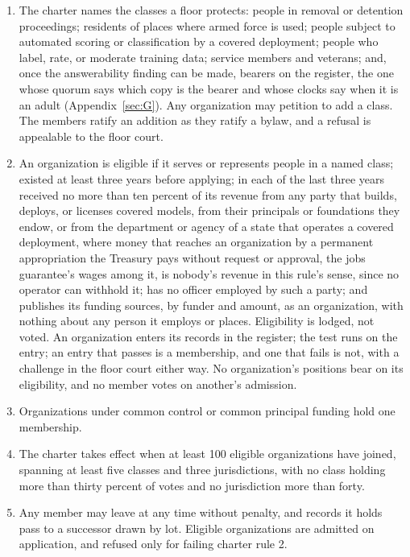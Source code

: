 \begin{enumerate}
\item[1.] The charter names the classes a floor protects: people in removal or detention proceedings; residents of places where armed force is used; people subject to automated scoring or classification by a covered deployment; people who label, rate, or moderate training data; service members and veterans; and, once the answerability finding can be made, bearers on the register, the one whose quorum says which copy is the bearer and whose clocks say when it is an adult (Appendix~\ref{sec:G}). Any organization may petition to add a class. The members ratify an addition as they ratify a bylaw, and a refusal is appealable to the floor court.
\item[2.] An organization is eligible if it serves or represents people in a named class; existed at least three years before applying; in each of the last three years received no more than ten percent of its revenue from any party that builds, deploys, or licenses covered models, from their principals or foundations they endow, or from the department or agency of a state that operates a covered deployment, where money that reaches an organization by a permanent appropriation the Treasury pays without request or approval, the jobs guarantee's wages among it, is nobody's revenue in this rule's sense, since no operator can withhold it; has no officer employed by such a party; and publishes its funding sources, by funder and amount, as an organization, with nothing about any person it employs or places. Eligibility is lodged, not voted. An organization enters its records in the register; the test runs on the entry; an entry that passes is a membership, and one that fails is not, with a challenge in the floor court either way. No organization's positions bear on its eligibility, and no member votes on another's admission.
\item[3.] Organizations under common control or common principal funding hold one membership.
\item[4.] The charter takes effect when at least 100 eligible organizations have joined, spanning at least five classes and three jurisdictions, with no class holding more than thirty percent of votes and no jurisdiction more than forty.
\item[5.] Any member may leave at any time without penalty, and records it holds pass to a successor drawn by lot. Eligible organizations are admitted on application, and refused only for failing charter rule 2.

\end{enumerate}
